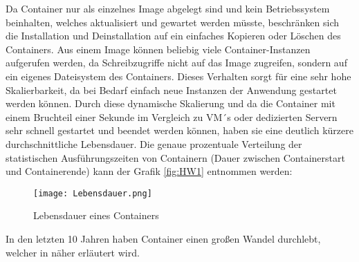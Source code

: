 Da Container nur als einzelnes Image abgelegt sind und kein Betriebssystem beinhalten, welches aktualisiert und gewartet werden müsste, beschränken sich die Installation und Deinstallation auf ein einfaches Kopieren oder Löschen des Containers. 
Aus einem Image können beliebig viele Container-Instanzen aufgerufen werden, da Schreibzugriffe nicht auf das Image zugreifen, sondern auf ein eigenes Dateisystem des Containers. Dieses Verhalten sorgt für eine sehr hohe Skalierbarkeit, da bei Bedarf einfach neue Instanzen der Anwendung gestartet werden können.\cite{12771285120180201}
Durch diese dynamische Skalierung und da die Container mit einem Bruchteil einer Sekunde im Vergleich zu VM´s oder dedizierten Servern sehr schnell gestartet und beendet werden können, haben sie eine deutlich kürzere durchschnittliche Lebensdauer. Die genaue prozentuale Verteilung der statistischen Ausführungszeiten von Containern (Dauer zwischen Containerstart und Containerende) kann der Grafik \ref{fig:HW1} entnommen werden:
\begin{figure}[H]
	\begin{center}
		\texttt{[image: Lebensdauer.png]}
	\end{center}
	\caption[Lebensdauer eines Containers]{Lebensdauer eines Containers \footnotemark}
	\label{fig:Lebensdauer}
\end{figure}
In den letzten 10 Jahren haben Container einen großen Wandel durchlebt, welcher in  näher erläutert wird.
\newpage